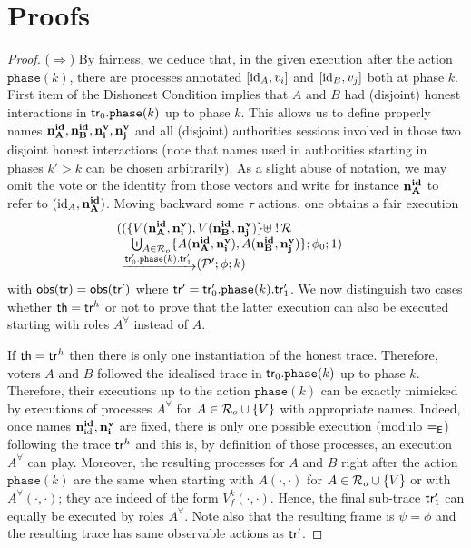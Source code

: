 \section{Proofs}
\label{sec:ap:proofs-thm}

\dishoLemma*
\begin{proof}
($\Rightarrow$)
  By fairness, we deduce that, in the given execution after the action $\mathtt{phase}(k)$,
  there are processes annotated $[\mathrm{id}_A,v_i]$ and $[\mathrm{id}_B,v_j]$ both at phase $k$.
  First item of the Dishonest Condition implies that $A$ and $B$ had (disjoint) honest interactions
  in $\mathsf{tr}_0.\mathtt{phase}(k)$ up to phase $k$.
  This allows us to define properly names ${\mathbf{n^{id}_{A}}},{\mathbf{n^{id}_{B}}},{\mathbf{n^{v}_{i}}},{\mathbf{n^{v}_{j}}}$
  and all (disjoint) authorities sessions involved in those two disjoint honest interactions
  (note that names used in authorities starting in phases $k'>k$ can be chosen arbitrarily).
  As a slight abuse of notation, we may omit the vote or the identity from those vectors
  and write for instance ${\mathbf{n^{id}_{A}}}$ to refer to $(\mathrm{id}_A,{\mathbf{n^{id}_{A}}})$.
  Moving backward some $\tau$ actions, one obtains a fair execution 
  \begin{equation}
    \begin{array}{ll}
\displaystyle
((\{
V(\nID{A},\nV{i}),
V(\nID{B},\nV{j})
\}\uplus\;!\,\roles &\\
\phantom{\{ \}}
\biguplus_{A\in\roles_o}
\{A(\nID{A},\nV{i}),
A(\nID{B},\nV{j})\}
;\phi_0;1)\\
\phantom{(}\sint{\tr_0'.\mathtt{phase}(k).\tr_1'}
(\p';\phi;k)&
    \end{array}
\label{eq:lem-cf-init}
\end{equation}
with $\mathsf{obs}(\mathsf{tr})=\mathsf{obs}(\mathsf{tr}')$ where $\mathsf{tr}'=\mathsf{tr}_0'.\mathtt{phase}(k).\mathsf{tr}_1'$.
We now distinguish two cases whether $\mathsf{th}=\mathsf{tr}^h$ or not to prove that the
latter execution can also be executed starting with roles $A^{\forall}$ instead of $A$.

If $\mathsf{th}=\mathsf{tr}^h$ then there is only one instantiation of the honest trace.
Therefore, voters $A$ and $B$ followed the idealised trace in $\mathsf{tr}_0.\mathtt{phase}(k)$ up to phase $k$.
Therefore, their executions up to the action $\mathtt{phase}(k)$
can be exactly mimicked by executions of processes $A^\forall$ for $A\in\mathcal{R}_o\cup\{V\}$ with appropriate names.
Indeed, once names ${\mathbf{n^{id}_{\mathrm{id}}}},{\mathbf{n^{v}_{i}}}$ are
fixed, there is only one possible execution (modulo $=_{\mathsf{E}}$) following the trace $\mathsf{tr}^h$ and this
is, by definition of those processes, an execution $A^\forall$ can play.
Moreover, the resulting processes for $A$ and $B$ right after the action $\mathtt{phase}(k)$
are the same when starting with $A(\cdot,\cdot)$ for $A\in\mathcal{R}_o\cup\{V\}$ or with $A^{\forall}(\cdot,\cdot)$;
they are indeed of the form $V^k_f(\cdot,\cdot)$. Hence, the final sub-trace $\mathsf{tr}_1'$ can equally be executed by roles $A^{\forall}$.
Note also that the resulting frame is $\psi=\phi$ and the resulting trace has same observable actions as $\mathsf{tr}'$.


\end{proof}
